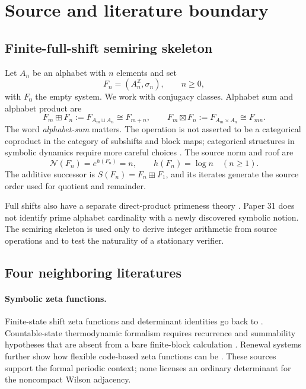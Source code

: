 \section{Source and literature boundary}
\label{sec:source-literature}

\subsection{Finite-full-shift semiring skeleton}

Let $A_n$ be an alphabet with $n$ elements and set
\[
  F_n=(A_n^{\mathbb Z},\sigma_n),\qquad n\geq0,
\]
with $F_0$ the empty system.  We work with conjugacy classes.  Alphabet sum
and alphabet product are
\[
  F_m\boxplus F_n:=F_{A_m\sqcup A_n}\cong F_{m+n},
  \qquad
  F_m\boxtimes F_n:=F_{A_m\times A_n}\cong F_{mn}.
\]
The word \emph{alphabet-sum} matters.  The operation is not asserted to be a
categorical coproduct in the category of subshifts and block maps; categorical
structures in symbolic dynamics require more careful choices
\citep{SaloTorma2015}.  The source norm and roof are
\[
  \mathcal N(F_n)=e^{h(F_n)}=n,
  \qquad h(F_n)=\log n\quad(n\geq1).
\]
The additive successor is $S(F_n)=F_n\boxplus F_1$, and its iterates generate
the source order used for quotient and remainder.

Full shifts also have a separate direct-product primeness theory
\citep{Kopra2023}.  Paper 31 does not identify prime alphabet cardinality with
a newly discovered symbolic notion.  The semiring skeleton is used only to
derive integer arithmetic from source operations and to test the naturality
of a stationary verifier.

\subsection{Four neighboring literatures}

\paragraph{Symbolic zeta functions.}
Finite-state shift zeta functions and determinant identities go back to
\citet{BowenLanford1970}.  Countable-state thermodynamic formalism requires
recurrence and summability hypotheses that are absent from a bare finite-block
calculation \citep{GurevichSavchenko1998,Sarig1999}.  Renewal systems further
show how flexible code-based zeta functions can be \citep{Hong2011}.  These
sources support the formal periodic context; none licenses an ordinary
determinant for the noncompact Wilson adjacency.

